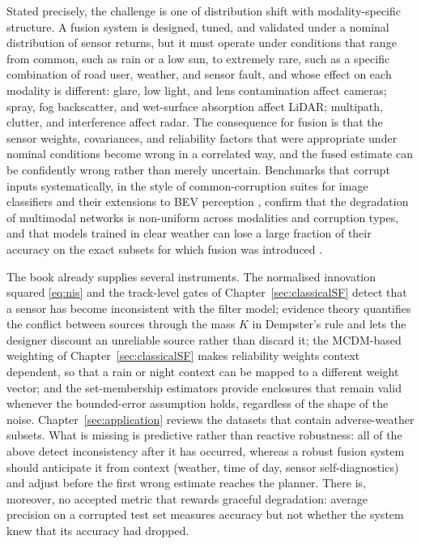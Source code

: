 Stated precisely, the challenge is one of distribution shift with modality-specific structure. A fusion system is designed, tuned, and validated under a nominal distribution of sensor returns, but it must operate under conditions that range from common, such as rain or a low sun, to extremely rare, such as a specific combination of road user, weather, and sensor fault, and whose effect on each modality is different: glare, low light, and lens contamination affect cameras; spray, fog backscatter, and wet-surface absorption affect LiDAR; multipath, clutter, and interference affect radar. The consequence for fusion is that the sensor weights, covariances, and reliability factors that were appropriate under nominal conditions become wrong in a correlated way, and the fused estimate can be confidently wrong rather than merely uncertain. Benchmarks that corrupt inputs systematically, in the style of common-corruption suites for image classifiers \cite{hendrycks2019_corruptions} and their extensions to BEV perception \cite{dong2023_robobev}, confirm that the degradation of multimodal networks is non-uniform across modalities and corruption types, and that models trained in clear weather can lose a large fraction of their accuracy on the exact subsets for which fusion was introduced \cite{bijelic2020_stf,feng2021_multimodal_survey}.

The book already supplies several instruments. The normalised innovation squared \eqref{eq:nis} and the track-level gates of Chapter~\ref{sec:classicalSF} detect that a sensor has become inconsistent with the filter model; evidence theory quantifies the conflict between sources through the mass $K$ in Dempster's rule and lets the designer discount an unreliable source rather than discard it; the MCDM-based weighting of Chapter~\ref{sec:classicalSF} makes reliability weights context dependent, so that a rain or night context can be mapped to a different weight vector; and the set-membership estimators provide enclosures that remain valid whenever the bounded-error assumption holds, regardless of the shape of the noise. Chapter~\ref{sec:application} reviews the datasets that contain adverse-weather subsets. What is missing is predictive rather than reactive robustness: all of the above detect inconsistency after it has occurred, whereas a robust fusion system should anticipate it from context (weather, time of day, sensor self-diagnostics) and adjust before the first wrong estimate reaches the planner. There is, moreover, no accepted metric that rewards graceful degradation: average precision on a corrupted test set measures accuracy but not whether the system knew that its accuracy had dropped.

